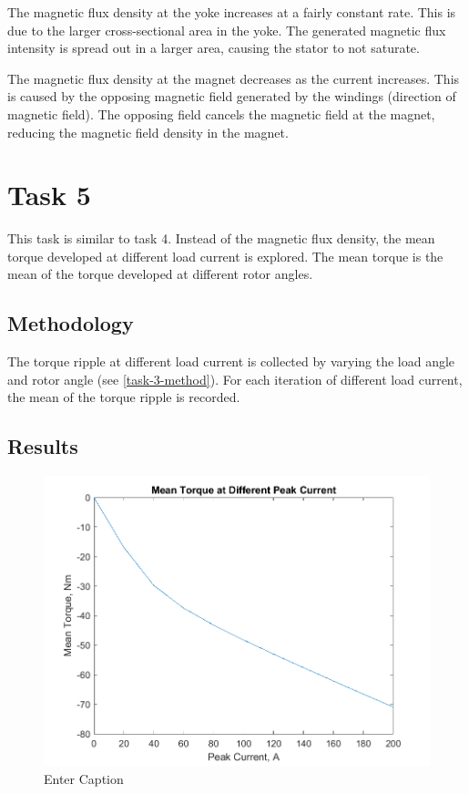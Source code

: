 \documentclass[12pt]{article}
\begin{document}
The magnetic flux density at the yoke increases at a fairly constant rate. This is due to the larger cross-sectional area in the yoke. The generated magnetic flux intensity is spread out in a larger area, causing the stator to not saturate.

The magnetic flux density at the magnet decreases as the current increases. This is caused by the opposing magnetic field generated by the windings (direction of magnetic field). The opposing field cancels the magnetic field at the magnet, reducing the magnetic field density in the magnet.

\section{Task 5}

This task is similar to task 4. Instead of the magnetic flux density, the mean torque developed at different load current is explored. The mean torque is the mean of the torque developed at different rotor angles.

\subsection{Methodology}

The torque ripple at different load current is collected by varying the load angle and rotor angle (see \ref{task-3-method}). For each iteration of different load current, the mean of the torque ripple is recorded.

\subsection{Results}

\begin{figure}[H]
    \centering
    \includegraphics[width=1\linewidth]{img/task_5.png}
    \caption{Enter Caption}
    \label{fig:enter-label}
\end{figure}
\end{document}
